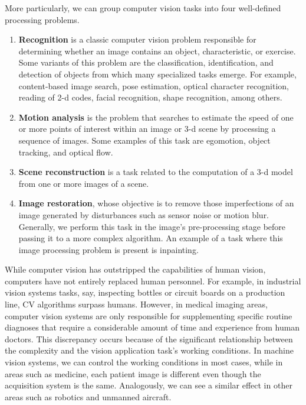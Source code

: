 More particularly, we can group computer vision tasks into four well-defined processing problems.

\begin{enumerate}[label=\roman*]
	\item \textbf{Recognition} is a classic computer vision problem responsible for determining whether an image contains an object, characteristic, or exercise. Some variants of this problem are the classification, identification, and detection of objects from which many specialized tasks emerge. For example, content-based image search, pose estimation, optical character recognition, reading of 2-d codes, facial recognition, shape recognition, among others.
	\item \textbf{Motion analysis} is the problem that searches to estimate the speed of one or more points of interest within an image or 3-d scene by processing a sequence of images. Some examples of this task are egomotion, object tracking, and optical flow.
	\item \textbf{Scene reconstruction} is a task related to the computation of a 3-d model from one or more images of a scene.
	\item \textbf{Image restoration}, whose objective is to remove those imperfections of an image generated by disturbances such as sensor noise or motion blur. Generally, we perform this task in the image's pre-processing stage before passing it to a more complex algorithm. An example of a task where this image processing problem is present is inpainting.
\end{enumerate}

While computer vision has outstripped the capabilities of human vision, computers have not entirely replaced human personnel. For example, in industrial vision systems tasks, say, inspecting bottles or circuit boards on a production line, CV algorithms surpass humans. However, in medical imaging areas, computer vision systems are only responsible for supplementing specific routine diagnoses that require a considerable amount of time and experience from human doctors. This discrepancy occurs because of the significant relationship between the complexity and the vision application task's working conditions. In machine vision systems, we can control the working conditions in most cases, while in areas such as medicine, each patient image is different even though the acquisition system is the same. Analogously, we can see a similar effect in other areas such as robotics and unmanned aircraft.

